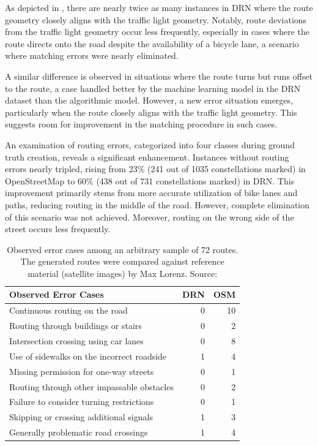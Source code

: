 As depicted in , there are nearly twice as many instances in DRN where the route geometry closely aligns with the traffic light geometry. Notably, route deviations from the traffic light geometry occur less frequently, especially in cases where the route directs onto the road despite the availability of a bicycle lane, a scenario where matching errors were nearly eliminated. 

A similar difference is observed in situations where the route turns but runs offset to the route, a case handled better by the machine learning model in the DRN dataset than the algorithmic model. However, a new error situation emerges, particularly when the route closely aligns with the traffic light geometry. This suggests room for improvement in the matching procedure in such cases.

An examination of routing errors, categorized into four classes during ground truth creation, reveals a significant enhancement. Instances without routing errors nearly tripled, rising from 23\% (241 out of 1035 constellations marked) in OpenStreetMap to 60\% (438 out of 731 constellations marked) in DRN. This improvement primarily stems from more accurate utilization of bike lanes and paths, reducing routing in the middle of the road. However, complete elimination of this scenario was not achieved. Moreover, routing on the wrong side of the street occurs less frequently.

\begin{table}[t]
\centering
\begin{tabular}{@{}lrr@{}}
\toprule
\textbf{Observed Error Cases} & \textbf{DRN} & \textbf{OSM} \\ \midrule
Continuous routing on the road & 0 & 10 \\
Routing through buildings or stairs & 0 & 2 \\
Intersection crossing using car lanes & 0 & 8 \\
Use of sidewalks on the incorrect roadside& 1 & 4 \\
Missing permission for one-way streets & 0 & 1 \\
Routing through other impassable obstacles & 0 & 2 \\
Failure to consider turning restrictions & 0 & 1 \\
Skipping or crossing additional signals & 1 & 3 \\
Generally problematic road crossings & 1 & 4 \\
\bottomrule
\end{tabular}
\caption{Observed error cases among an arbitrary sample of 72 routes. The generated routes were compared against reference material (satellite images) by Max Lorenz. Source: \cite{lorenz_2022}}%
\label{tab:error-cases-max-lorenz}%
\end{table}

